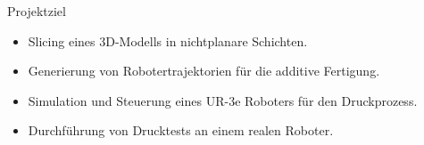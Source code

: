 \begin{frame}{Projektziel}
    \begin{itemize}
        \item Slicing eines 3D-Modells in nichtplanare Schichten.
        \vspace{0.2cm}
        \item Generierung von Robotertrajektorien für die additive Fertigung.
        \vspace{0.2cm}
        \item Simulation und Steuerung eines UR-3e Roboters für den Druckprozess.
        \vspace{0.2cm}
        \item Durchführung von Drucktests an einem realen Roboter.
    \end{itemize}
\end{frame}